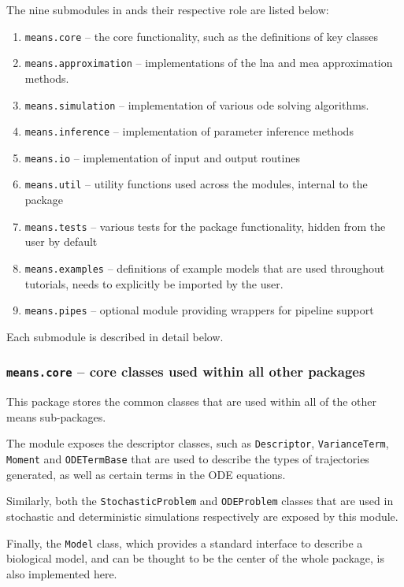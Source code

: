 The nine submodules in \means{} ands their respective role are listed below:
\begin{enumerate}
    \item \verb"means.core" -- the core functionality, such as the definitions of key classes
    \item \verb"means.approximation" -- implementations of the \gls{lna} and \gls{mea} approximation methods.
    
    \item \verb"means.simulation" -- implementation of various \gls{ode} solving algorithms.
    \item \verb"means.inference" -- implementation of parameter inference methods
    \item \verb"means.io" -- implementation of input and output routines
    \item \verb"means.util" -- utility functions used across the modules, internal to the package
    \item \verb"means.tests" -- various tests for the package functionality, hidden from the user by default
    \item \verb"means.examples" -- definitions of example models that are used throughout tutorials, needs to explicitly be imported by the user.
    \item \verb"means.pipes" -- optional module providing wrappers for pipeline support
\end{enumerate}

Each submodule is described in detail below.

\subsubsection{{\tt means.core} -- core classes used within all other packages}
This package stores the common classes that are used within all of the other means sub-packages.

The module exposes the descriptor classes, such as \verb"Descriptor",
\verb"VarianceTerm", \verb"Moment" and
\verb"ODETermBase" that are used to describe the types of trajectories generated,
as well as certain terms in the ODE equations.

Similarly, both the \verb"StochasticProblem" and
\verb"ODEProblem" classes that are used in stochastic and deterministic simulations respectively are exposed by this module.

Finally, the \verb"Model" class, which provides a standard interface to describe a biological model, and can be thought to be the center of the whole package, is also implemented here.

